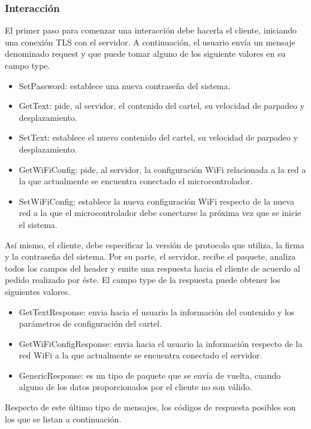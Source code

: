 \subsubsection{Interacción}

El primer paso para comenzar una interacción debe hacerla el cliente, iniciando una conexión TLS con el servidor.
A continuación, el usuario envía un mensaje denominado request y que puede tomar alguno de los siguiente valores en su campo type.

\begin{itemize}
	\item SetPassword: establece una nueva contraseña del sistema.
	\item GetText: pide, al servidor, el contenido del cartel, su velocidad de parpadeo y desplazamiento.
	\item SetText: establece el nuevo contenido del cartel, su velocidad de parpadeo y desplazamiento.
	\item GetWiFiConfig: pide, al servidor, la configuración WiFi relacionada a la red a la que actualmente se encuentra conectado el microcontrolador.
	\item SetWiFiConfig: establece la nueva configuración WiFi respecto de la nueva red a la que el microcontrolador debe conectarse la próxima vez que se inicie el sistema.
\end{itemize}

Así mismo, el cliente, debe especificar la versión de protocolo que utiliza, la firma y la contraseña del sistema.
Por su parte, el servidor, recibe el paquete, analiza todos los campos del header y emite una respuesta hacia el cliente de acuerdo al pedido realizado por éste.
El campo type de la respuesta puede obtener los siguientes valores.

\begin{itemize}
	\item GetTextResponse: envia hacia el usuario la información del contenido y los parámetros de configuración del cartel.
	\item GetWiFiConfigResponse: envia hacia el usuario la información respecto de la red WiFi a la que actualmente se encuentra conectado el servidor.
	\item GenericResponse: es un tipo de paquete que se envía de vuelta, cuando alguno de los datos proporcionados por el cliente no son válido.
\end{itemize}

Respecto de este último tipo de mensajes, los códigos de respuesta posibles son los que se listan a continuación.

